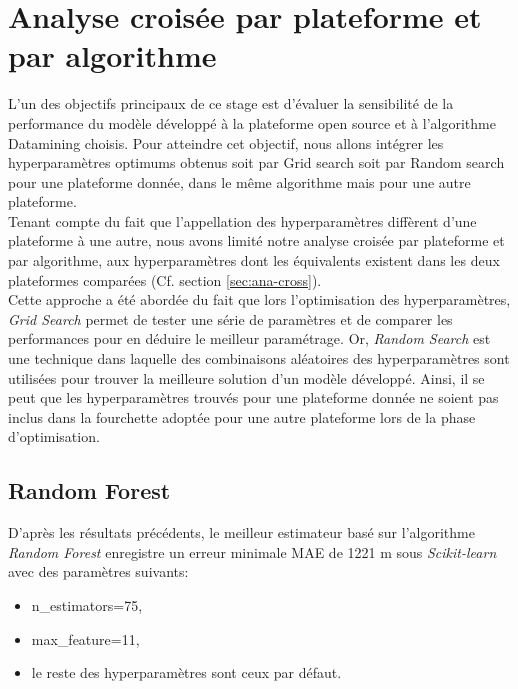 \section{Analyse croisée par plateforme et par algorithme}
L'un des objectifs principaux de ce stage est d'évaluer la sensibilité de la performance du modèle développé à la plateforme open source et à l'algorithme Datamining choisis. Pour atteindre cet objectif, nous allons intégrer les hyperparamètres optimums obtenus soit par Grid search soit par Random search pour une plateforme donnée, dans le même algorithme mais pour une autre plateforme.\\ 

Tenant compte du fait que l'appellation des hyperparamètres diffèrent d'une plateforme à une autre, nous avons limité notre analyse croisée par plateforme et par algorithme, aux hyperparamètres dont les équivalents existent dans les deux plateformes comparées (Cf. section \ref{sec:ana-cross}).\\

Cette approche a été abordée du fait  que lors l'optimisation des hyperparamètres, \textit{Grid Search} permet de tester une série de paramètres et de comparer les performances pour en déduire le meilleur paramétrage. Or, \textit{Random Search} est une technique dans laquelle des combinaisons aléatoires des hyperparamètres sont utilisées pour trouver la meilleure solution d'un modèle développé. Ainsi, il se peut que les hyperparamètres trouvés pour une plateforme donnée ne soient pas inclus dans la fourchette adoptée pour une autre plateforme lors de la phase d'optimisation.\\

\subsection*{Random Forest}
D'après les résultats précédents, le meilleur estimateur basé sur l'algorithme \textit{Random Forest} enregistre un erreur minimale MAE de 1221 m sous \textit{Scikit-learn} avec des paramètres suivants:

\begin{itemize}
    \item[\ding{223}] n\_estimators=75,
    \item[\ding{223}] max\_feature=11,
    \item[\ding{223}] le reste des hyperparamètres sont ceux par défaut.\\
\end{itemize}

